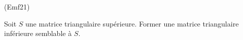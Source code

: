 \begin{tiny}(Emf21)\end{tiny} Soit $S$ une matrice triangulaire supérieure. Former une matrice triangulaire inférieure semblable à $S$. 
